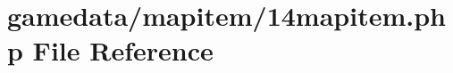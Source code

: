 \hypertarget{14mapitem_8php}{\section{gamedata/mapitem/14mapitem.php File Reference}
\label{14mapitem_8php}
}
